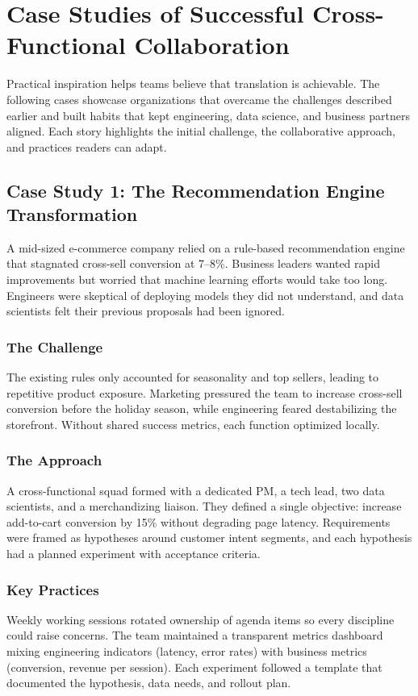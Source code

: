 \chapter{Case Studies of Successful Cross-Functional Collaboration}
\label{ch:case-studies-success}

Practical inspiration helps teams believe that translation is achievable. The following cases showcase organizations that overcame the challenges described earlier and built habits that kept engineering, data science, and business partners aligned. Each story highlights the initial challenge, the collaborative approach, and practices readers can adapt.

\section{Case Study 1: The Recommendation Engine Transformation}
\label{sec:case-recommendation}

A mid-sized e-commerce company relied on a rule-based recommendation engine that stagnated cross-sell conversion at 7--8\%. Business leaders wanted rapid improvements but worried that machine learning efforts would take too long. Engineers were skeptical of deploying models they did not understand, and data scientists felt their previous proposals had been ignored.

\subsection{The Challenge}
The existing rules only accounted for seasonality and top sellers, leading to repetitive product exposure. Marketing pressured the team to increase cross-sell conversion before the holiday season, while engineering feared destabilizing the storefront. Without shared success metrics, each function optimized locally.

\subsection{The Approach}
A cross-functional squad formed with a dedicated PM, a tech lead, two data scientists, and a merchandizing liaison. They defined a single objective: increase add-to-cart conversion by 15\% without degrading page latency. Requirements were framed as hypotheses around customer intent segments, and each hypothesis had a planned experiment with acceptance criteria.

\subsection{Key Practices}
Weekly working sessions rotated ownership of agenda items so every discipline could raise concerns. The team maintained a transparent metrics dashboard mixing engineering indicators (latency, error rates) with business metrics (conversion, revenue per session). Each experiment followed a template that documented the hypothesis, data needs, and rollout plan.

